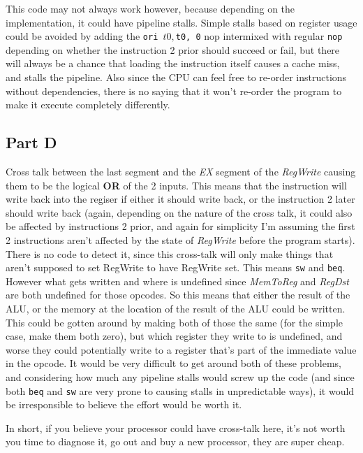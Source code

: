 \documentclass[11pt]{article} %
\newcommand{\strong}[1]{\textbf{#1}}
\newcommand{\code}[1]{\texttt{#1}}
\begin{document}
This code may not always work however, because depending on the implementation, it could have pipeline stalls. Simple stalls based on register usage could be avoided by adding the \code{ori $t0, $t0, 0} nop intermixed with regular \code{nop} depending on whether the instruction 2 prior should succeed or fail, but there will always be a chance that loading the instruction itself causes a cache miss, and stalls the pipeline. Also since the CPU can feel free to re-order instructions without dependencies, there is no saying that it won't re-order the program to make it execute completely differently.

\subsection{Part D}

Cross talk between the last segment and the \emph{EX} segment of the \emph{RegWrite} causing them to be the logical \strong{OR} of the 2 inputs. This means that the instruction will write back into the regiser if either it should write back, or the instruction 2 later should write back (again, depending on the nature of the cross talk, it could also be affected by instructions 2 prior, and again for simplicity I'm assuming the first 2 instructions aren't affected by the state of \emph{RegWrite} before the program starts). There is no code to detect it, since this cross-talk will only make things that aren't supposed to set RegWrite to have RegWrite set. This means \code{sw} and \code{beq}. However what gets written and where is undefined since \emph{MemToReg} and \emph{RegDst} are both undefined for those opcodes. So this means that either the result of the ALU, or the memory at the location of the result of the ALU could be written. This could be gotten around by making both of those the same (for the simple case, make them both zero), but which register they write to is undefined, and worse they could potentially write to a register that's part of the immediate value in the opcode. It would be very difficult to get around both of these problems, and considering how much any pipeline stalls would screw up the code (and since both \code{beq} and \code{sw} are very prone to causing stalls in unpredictable ways), it would be irresponsible to believe the effort would be worth it.

In short, if you believe your processor could have cross-talk here, it's not worth you time to diagnose it, go out and buy a new processor, they are super cheap.
\end{document}
